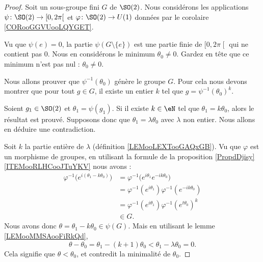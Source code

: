 \begin{proof}
	Soit un sous-groupe fini \(G\) de \( \SO(2)\). Nous considérons les applications \( \psi\colon \SO(2) \to \mathopen[ 0 , 2\pi \mathclose[\) et \( \varphi\colon \SO(2)\to U(1)\) données par le corolaire \ref{CORooGGVUooLQYGET}.

	Vu que \( \psi(e)=0\), la partie \( \psi(G\setminus\{ e \})\) est une partie finie de \( \mathopen[ 0 , 2\pi \mathclose[\) qui ne contient pas \( 0\). Nous en considérons le minimum \( \theta_0\neq 0\). Gardez en tête que ce minimum n'est pas nul : \( \theta_0\neq 0\).

	Nous allons prouver que \( \psi^{-1}(\theta_0)\) génère le groupe \( G\). Pour cela nous devons montrer que pour tout \( g\in G\), il existe un entier \( k\) tel que \( g=\psi^{-1}(\theta_0)^k\).

	Soient \( g_1\in\SO(2)\) et \( \theta_1=\psi(g_1)\). Si il existe \( k\in \eN\) tel que \( \theta_1= k\theta_0\), alors le résultat est prouvé. Supposons donc que \( \theta_1=\lambda \theta_0\) avec \( \lambda\) non entier. Nous allons en déduire une contradiction.

	Soit \( k\) la partie entière de \( \lambda\) (définition \ref{LEMooLEXTooGAQxGB}). Vu que \( \varphi\) est un morphisme de groupes, en utilisant la formule de la proposition \ref{PropdDjisy}\ref{ITEMooRLHCooJTuYKV} nous avons :
	\begin{subequations}
		\begin{align}
			\varphi^{-1}\big(  e^{i(\theta_1-k\theta_0)} \big) & =\varphi^{-1}\big(  e^{i\theta_1} e^{-ik\theta_0} \big)     \\
			                                                   & =\varphi^{-1}( e^{i\theta_1})\varphi^{-1}( e^{-ik\theta_0}) \\
			                                                   & =\varphi^{-1}( e^{i\theta_1})\varphi^{-1}( e^{t\theta_0})^k \\
			                                                   & \in G.
		\end{align}
	\end{subequations}
	Nous avons donc \( \theta=\theta_1-k\theta_0\in \psi(G)\). Mais en utilisant le lemme \ref{LEMooMMSAooFiRkQd},
	\begin{equation}
		\theta-\theta_0=\theta_1-(k+1)\theta_0<\theta_1-\lambda \theta_0=0.
	\end{equation}
	Cela signifie que \( \theta<\theta_0\), et contredit la minimalité de \( \theta_0\).
\end{proof}

